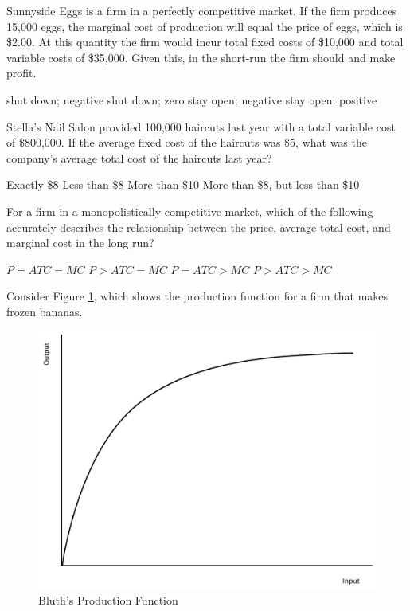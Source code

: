 \documentclass[addpoints,11pt]{exam}
\theoremstyle{definition}
\newcommand{\blank}[0]{\underline{\hspace{3cm}}}
\begin{document}
\begin{questions}
	
	
	\question Sunnyside Eggs is a firm in a perfectly competitive market. If the firm produces 15,000 eggs, the marginal cost of production will equal the price of eggs, which is \$2.00. At this quantity the firm would incur total fixed costs of \$10,000 and total variable costs of \$35,000. Given this, in the short-run the firm should \blank and make \blank profit.
	
	\begin{choices}
		\CorrectChoice shut down; negative
		\choice shut down; zero
		\choice stay open; negative
		\choice stay open; positive
	\end{choices}

\question Stella's Nail Salon provided 100,000 haircuts last year with a total variable cost of \$800,000. If the average fixed cost of the haircuts was \$5, what was the company's average total cost of the haircuts last year?


\begin{choices}
	\choice Exactly \$8
	\choice Less than \$8
	\CorrectChoice More than \$10
	\choice More than \$8, but less than \$10
\end{choices}


	\question For a firm in a monopolistically competitive market, which of the following accurately describes the relationship between the price, average total cost, and marginal cost in the long run?

\begin{choices}
	\choice $P = ATC = MC$
	\choice $P > ATC = MC$
	\CorrectChoice $P = ATC > MC$
	\choice $P > ATC > MC$
\end{choices}

\newpage

	\question Consider Figure \ref{mc2}, which shows the production function for a firm that makes frozen bananas.
	
	\begin{figure}[H]
		\centering
		\includegraphics[scale=.40]{plot54.pdf}
		\caption{Bluth's Production Function}
		\label{mc2}
	\end{figure}


\end{questions}
\end{document}
